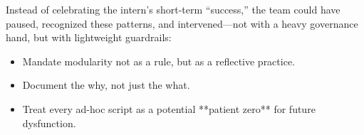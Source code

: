 Instead of celebrating the intern’s short-term “success,” the team could have paused, recognized these patterns, and intervened—not with a heavy governance hand, but with lightweight guardrails:

\begin{itemize}
    \item Mandate modularity not as a rule, but as a reflective practice.
    \item Document the why, not just the what.
    \item Treat every ad-hoc script as a potential **patient zero** for future dysfunction.
\end{itemize}






